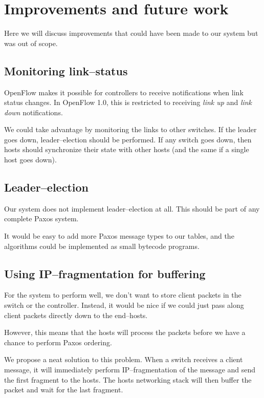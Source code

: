 \chapter{Improvements and future work}

Here we will discuss improvements that could have been made to our system
but was out of scope.

\section{Monitoring link--status}

OpenFlow makes it possible for controllers to receive notifications when
link status changes.  In OpenFlow 1.0, this is restricted to receiving
\textit{link up} and \textit{link down} notifications.

We could take advantage by monitoring the links to other switches.
If the leader goes down, leader--election should be performed.
If any switch goes down, then hosts should synchronize their state with
other hosts (and the same if a single host goes down).

\section{Leader--election}

Our system does not implement leader--election at all.  This should be part
of any complete Paxos system.

It would be easy to add more Paxos message types to our tables, and the
algorithms could be implemented as small bytecode programs.

\section{Using IP--fragmentation for buffering}

For the system to perform well, we don't want to store client packets in the
switch or the controller.  Instead, it would be nice if we could just pass
along client packets directly down to the end--hosts.

However, this means that the hosts will process the packets before we have a
chance to perform Paxos ordering.

We propose a neat solution to this problem.  When a switch receives a client
message, it will immediately perform IP--fragmentation of the message and
send the first fragment to the hosts.  The hosts networking stack will then
buffer the packet and wait for the last fragment.

